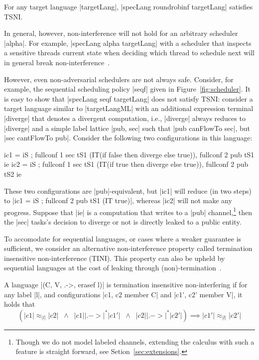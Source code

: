 \begin{theorem}
  \label{thm:rr-tsni}
For any target language |targetLang|, |specLang roundrobinf
targetLang| satisfies TSNI.
\end{theorem}

In general, however, non-interference will not hold for an arbitrary scheduler |alpha|.
%
For example, |specLang alpha targetLang| with a scheduler that inspects a
sensitive threads current state when deciding which thread to schedule next
will in general break non-interference~\cite{Russo:Sabelfeld:CSFW06,BartheRRS07}.
%
%

However, even non-adversarial schedulers are not always safe.
Consider, for example, the sequential scheduling policy |seqf| given in
Figure~\ref{fig:scheduler}.
%
It is easy to show that |specLang seqf targetLang| does not satisfy
TSNI:
%
consider a target language similar to |targetLangML| with an
additional expression terminal |diverge| that denotes a divergent computation,
i.e., |diverge| always reduces to |diverge| and a simple label lattice |{pub,
sec}| such that |pub canFlowTo sec|, but |sec cantFlowTo pub|.
Consider the following two configurations in this language:
\begin{code}
ic1 = iS ; fullconf 1 sec tS1 (IT(if false then diverge else true)),  fullconf 2 pub tS1 ie
ic2 = iS ; fullconf 1 sec tS1 (IT(if true then diverge else true)),   fullconf 2 pub tS2 ie
\end{code}
These two configurations are |pub|-equivalent, but |ic1| will reduce 
(in two steps) 
to |ic1 = iS ; fullconf 2 pub tS1 (IT true)|, whereas |ic2| will not make
any progress.
%
Suppose that |ie| is a computation that writes to a |pub| channel,\footnote{
Though we do not model labeled channels, extending the calculus with such a
feature is straight forward, see Setion~\ref{sec:extensions}.}
then the |sec| tasks's decision to diverge or not is directly leaked to a
public entity.

%
To accomodate for sequential languages, or cases where a weaker guarantee
is sufficient, we consider an alternative non-interference property called termination insensitive
non-interference (TINI).  This property can also be upheld by sequential languages at the cost
of leaking through (non)-termination~\cite{Askarov:2008}.
%
\begin{definition}
  A language |(C, V, .->, erasef l)| is termination
  insensitive non-interfering if for any label |l|, and configurations
  |c1, c2 member C| and |c1', c2' member V|, it holds that
  \[
    (|c1| \approx_{|l|} |c2|
    \;\;\land\;\;
    |c1| |.->|^* |c1'|
    \;\;\land\;\;
    |c2| |.->|^* |c2'|)
    \implies
    |c1'| \approx_{|l|} |c2'|
  \]
\end{definition}

